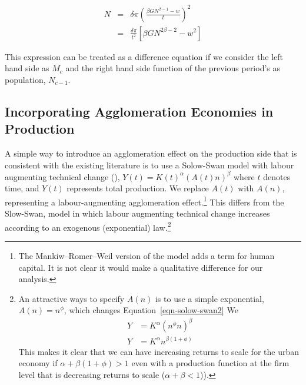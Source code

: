 \begin{eqnarray}
    N&=&\delta\pi (\frac{\beta GN^{\beta-1}-w}{t})^2\\
    &=&\frac{\delta\pi }{t^2} \left[\beta GN^{2\beta-2} -w^2\right]
\end{eqnarray}

This expression can be treated as a difference equation if we consider the left hand side as $M_{c}$ and the right hand side  function of the previous period's as population, $N_{{c}-1}$.



\subsection{Incorporating Agglomeration Economies in Production} \label{sec-agglomeration-production}
A simple way  to introduce an agglomeration effect on the production side that is consistent with the existing literature is  to use a \gls{Solow-Swan model} with labour augmenting technical change (\cite{solowContributionTheoryEconomic1956, swanEconomicGrowthCapital1956}), $Y(t)=K(t)^{\alpha }(A(t)n)^{\beta }$ where $t$ denotes time,  %
 and $Y (t )$  represents total production. 
We %
 replace $A(t)$ %
  with $A(n)$, representing a labour-augmenting agglomeration effect.\footnote{The Mankiw–Romer–Weil version of the model adds a term for human capital.  It is not clear it would make a qualitative difference for our analysis.}  This differs from  the Slow-Swan, model in which labour augmenting technical change increases according to an exogenous (exponential) law.\footnote{An attractive ways to specify $A(n)$  is to use a simple exponential, $A(n)=n^\phi$, which changes Equation~\ref{eqn-solow-swan2} 
  We %
\begin{eqnarray}
 Y&=K^{\alpha }(n^{\phi }n)^{\beta}  \nonumber\\
 Y&=K^{\alpha }n^{\beta(1 +\phi)}
\label{eqn-solow-swan1}
\end{eqnarray}
This makes it clear that we can have increasing returns to scale for the urban economy if  $\alpha + \beta(1+ \phi)>1$ even with a production function at the firm level that is decreasing returns to scale ($\alpha +\beta<1$)).\label{footnote-psi}}  
  
